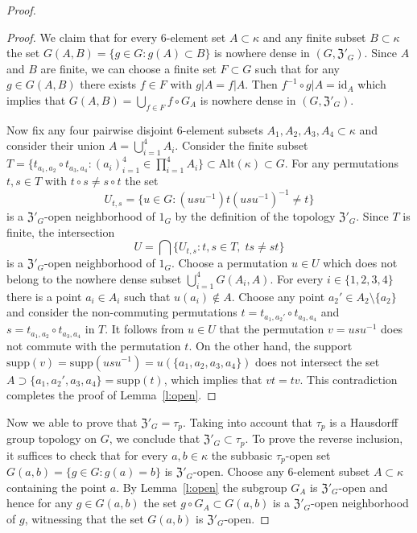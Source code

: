 \documentclass[11pt, twoside]{amsart}
\theoremstyle{definition}
\begin{document}
\begin{proof}
\begin{proof}
We claim that for every 6-element set $A\subset \kappa$ and any finite subset $B\subset \kappa$ the set $G(A,B)=\{g\in G:g(A)\subset B\}$ is nowhere dense in $(G,{\mathfrak Z}'_G)$. Since $A$ and $B$ are finite, we can choose a finite set $F\subset G$ such that for any $g\in G(A,B)$ there exists $f\in F$ with $g|A=f|A$. Then $f^{-1}\circ g|A={\mathrm{id}}_A$ which implies that $G(A,B)=\bigcup_{f\in F}f\circ G_A$ is nowhere dense in $(G,{\mathfrak Z}'_G)$.

Now fix any four pairwise disjoint 6-element subsets $A_1,A_2,A_3,A_4\subset \kappa$ and consider their union $A=\bigcup_{i=1}^4A_i$. Consider the finite subset $T=\{t_{a_1,a_2}\circ t_{a_3,a_4}:(a_i)_{i=1}^4\in \prod_{i=1}^4A_i\}\subset {\mathrm{Alt}}(\kappa)\subset G$. For any permutations $t,s\in T$ with $t\circ s\ne s\circ t$ the set
$$U_{t,s}=\{u\in G:(usu^{-1})t(usu^{-1})^{-1}\ne t\}$$is a ${\mathfrak Z}'_G$-open neighborhood of $1_G$ by the definition of the topology ${\mathfrak Z}'_G$. Since $T$ is finite, the intersection
$$U=\bigcap\{U_{t,s}:t,s\in T,\;ts\ne st\}$$is a ${\mathfrak Z}'_G$-open neighborhood of $1_G$. Choose a permutation $u\in U$ which does not belong to the nowhere dense subset $\bigcup_{i=1}^4G(A_i,A)$. For every $i\in\{1,2,3,4\}$ there is a point $a_i\in A_i$ such that $u(a_i)\notin A$. Choose any point $a_2'\in A_2\setminus\{a_2\}$ and consider the non-commuting permutations $t=t_{a_1,a_2'}\circ t_{a_3,a_4}$ and $s=t_{a_1,a_2}\circ t_{a_3,a_4}$ in $T$.
It follows from $u\in U$ that the permutation $v=usu^{-1}$ does not commute with the permutation $t$. On the other hand, the support ${\mathrm{supp}}(v)={\mathrm{supp}}(usu^{-1})=u(\{a_1,a_2,a_3,a_4\})$ does not intersect the set $A\supset \{a_1,a_2',a_3,a_4\}={\mathrm{supp}}(t)$, which implies that $vt=tv$. This contradiction completes the proof of Lemma~\ref{l:open}.
\end{proof}

Now we able to prove that ${\mathfrak Z}'_G=\tau_p$. Taking into account that $\tau_p$ is a Hausdorff group topology on $G$, we conclude that ${\mathfrak Z}'_G\subset\tau_p$. To prove the reverse inclusion, it suffices to check that for every $a,b\in \kappa$ the subbasic $\tau_p$-open set $G(a,b)=\{g\in G:g(a)=b\}$ is ${\mathfrak Z}'_G$-open. Choose any 6-element subset $A\subset\kappa$ containing the point $a$. By Lemma~\ref{l:open} the subgroup $G_A$ is ${\mathfrak Z}'_G$-open and hence for any $g\in G(a,b)$ the set $g\circ G_A\subset G(a,b)$ is a ${\mathfrak Z}'_G$-open neighborhood of $g$, witnessing that the set $G(a,b)$ is ${\mathfrak Z}'_G$-open.
\end{proof}
\end{document}
